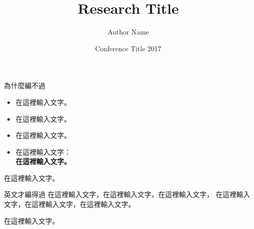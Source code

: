 \documentclass[final,hyperref={pdfpagelabels=false}]{beamer}
\institute[INST]{Institute Name}
\date[CONF 2017]{Conference Title 2017}
\title{Research Title}
\author[ywpu]{Author Name}
\begin{document}
\begin{CJK}{UTF8}{bsmi}
\begin{frame}
\centering

\begin{block}{為什麼編不過}
\begin{minipage}{0.64\paperwidth}
  \begin{itemize}
    \item 在這裡輸入文字。
    \item 在這裡輸入文字。
    \item 在這裡輸入文字。
    \item 在這裡輸入文字：\\\textbf{在這裡輸入文字。}
  \end{itemize}
\end{minipage}
\qquad
\begin{minipage}{0.29\paperwidth}
  \begin{center}
    在這裡輸入文字。
  \end{center}
\end{minipage}
\end{block}

\begin{block}{英文才編得過}
  在這裡輸入文字，在這裡輸入文字，在這裡輸入文字，%
  在這裡輸入文字，在這裡輸入文字，在這裡輸入文字。%
  \vspace*{10mm}
  \begin{center}
    在這裡輸入文字。
  \end{center}
\end{block}


\end{frame}
\end{CJK}
\end{document}
